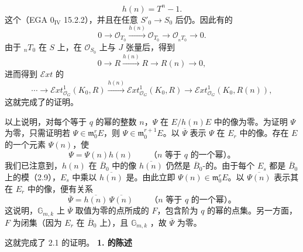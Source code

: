 \[h(n)=T^n-1.\]
这个（EGA 0$_{\mathrm{IV}}$ 15.2.2），并且在任意 $S'_0\to S_0$ 后仍。因此有的
\[0\longrightarrow\mathcal O_{T_0}\xrightarrow{h(n)}\mathcal O_{T_0}\longrightarrow\mathcal O_{{}_nT_0}\longrightarrow0.\]
由于 ${}_nT_0$ 在 $S$ 上，在 $\mathcal O_{S_0}$ 上与 $J$ 张量后，得到
\[0\longrightarrow R\xrightarrow{h(n)}R\longrightarrow R(n)\longrightarrow0,\]
进而得到 $\mathscr Ext$ 的
\[\cdots\longrightarrow\mathscr Ext^1_{\mathcal O_G}(K_0,R)\xrightarrow{h(n)}\mathscr Ext^1_{\mathcal O_G}(K_0,R)\longrightarrow\mathscr Ext^1_{\mathcal O_G}(K_0,R(n)),\]
这就完成了的证明。

以上说明，对每个等于 $q$ 的幂的整数 $n$，$\Psi$ 在 $E/h(n)E$ 中的像为零。为证明 $\Psi$ 为零，只需证明若 $\Psi\in\mathfrak m_0^rE$，则 $\Psi\in\mathfrak m_0^{r+1}E$。以 $\overline\Psi$ 表示 $\Psi$ 在 $E_r$ 中的像。存在 $E$ 的一个元素 $\Psi(n)$，使
\[\Psi=\Psi(n)h(n)\qquad\text{（$n$ 等于 $q$ 的一个幂）。}\]
我们已注意到，$h(n)$ 在 $\overline B_0$ 中的像 $\overline{h(n)}$ 仍然是 $\overline B_0$-的。由于每个 $E_s$ 都是 $\overline B_0$ 上的模（2.9），$E_s$ 中乘以 $\overline{h(n)}$ 是。由此立即 $\Psi(n)\in\mathfrak m_0^rE$。以 $\overline{\Psi(n)}$ 表示其在 $E_r$ 中的像，便有关系
\[\overline\Psi=\overline{h(n)}\,\overline{\Psi(n)}\qquad\text{（$n$ 等于 $q$ 的一个幂）。}\]
这说明，$\mathbb G_{m,k}$ 上 $\overline\Psi$ 取值为零的点所成的 $F$，包含阶为 $q$ 的幂的点集。另一方面，$F$ 为闭集（因为 $E_r$ 在 $\overline B_0$ 上），且 $\mathbb G_{m,k}$ ，故 $\overline\Psi$ 为零。

这就完成了 2.1 的证明。
\textbf{1. 的陈述}

